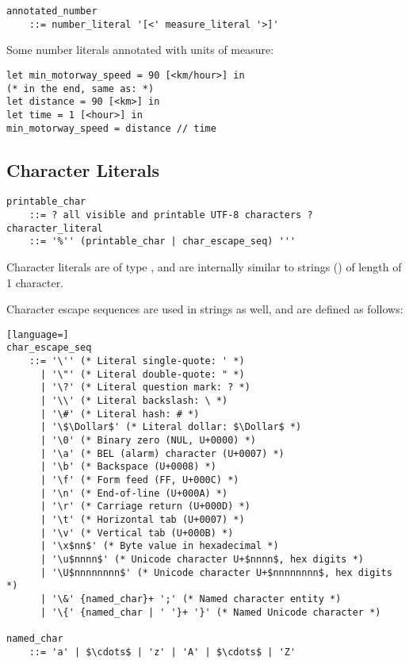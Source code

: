 \syntax\begin{lstlisting}
annotated_number 
    ::= number_literal '[<' measure_literal '>]'
\end{lstlisting}

\example Some number literals annotated with units of measure:
\begin{lstlisting}
let min_motorway_speed = 90 [<km/hour>] in
(* in the end, same as: *)
let distance = 90 [<km>] in
let time = 1 [<hour>] in
min_motorway_speed = distance // time
\end{lstlisting}






\subsection{Character Literals}
\label{sec:characterliterals}

\syntax\begin{lstlisting}[deletekeywords={and,all}]
printable_char 
    ::= ? all visible and printable UTF-8 characters ? 
character_literal 
    ::= '%'' (printable_char | char_escape_seq) '''
\end{lstlisting}

Character literals are of type , and are internally similar to strings () of length of 1 character. 

Character escape sequences are used in strings as well, and are defined as follows: 

\syntax\begin{lstlisting}[language=]
char_escape_seq 
    ::= '\'' (* Literal single-quote: ' *)
      | '\"' (* Literal double-quote: " *)
      | '\?' (* Literal question mark: ? *)
      | '\\' (* Literal backslash: \ *)
      | '\#' (* Literal hash: # *)
      | '\$\Dollar$' (* Literal dollar: $\Dollar$ *)
      | '\0' (* Binary zero (NUL, U+0000) *)
      | '\a' (* BEL (alarm) character (U+0007) *)
      | '\b' (* Backspace (U+0008) *)
      | '\f' (* Form feed (FF, U+000C) *)
      | '\n' (* End-of-line (U+000A) *)
      | '\r' (* Carriage return (U+000D) *)
      | '\t' (* Horizontal tab (U+0007) *)
      | '\v' (* Vertical tab (U+000B) *)
      | '\x$nn$' (* Byte value in hexadecimal *)
      | '\u$nnnn$' (* Unicode character U+$nnnn$, hex digits *)
      | '\U$nnnnnnnn$' (* Unicode character U+$nnnnnnnn$, hex digits *)
      | '\&' {named_char}+ ';' (* Named character entity *)
      | '\{' {named_char | ' '}+ '}' (* Named Unicode character *)
      
named_char 
    ::= 'a' | $\cdots$ | 'z' | 'A' | $\cdots$ | 'Z'
\end{lstlisting}

